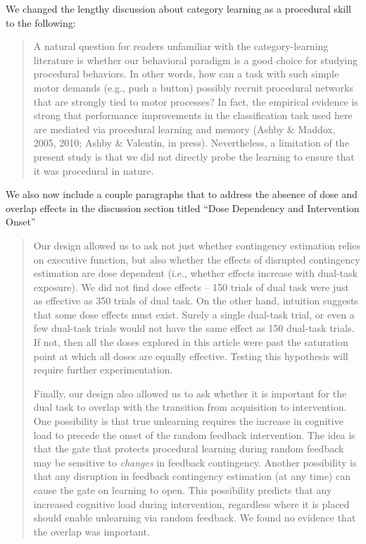 \documentclass[10pt,a4paper]{article}
\begin{document}
We changed the lengthy discussion about category learning as a procedural skill
to the following:

\begin{quote}
  A natural question for readers unfamiliar with the category-learning
  literature is whether our behavioral paradigm is a good choice for studying
  procedural behaviors. In other words, how can a task with such simple motor
  demands (e.g., push a button) possibly recruit procedural networks that are
  strongly tied to motor processes? In fact, the empirical evidence is strong that
  performance improvements in the classification task used here are mediated via
  procedural learning and memory (Ashby \& Maddox, 2005, 2010; Ashby \& Valentin,
  in press). Nevertheless, a limitation of the present study is that we did not
  directly probe the learning to ensure that it was procedural in nature.
\end{quote}

We also now include a couple paragraphs that to address the absence of dose and
overlap effects in the discussion section titled ``Dose Dependency and
Intervention Onset''

\begin{quote}
  Our design allowed us to ask not just whether contingency estimation relies on
  executive function, but also whether the effects of disrupted contingency
  estimation are dose dependent (i.e., whether effects increase with dual-task
  exposure). We did not find dose effects -- 150 trials of dual task were just as
  effective as 350 trials of dual task. On the other hand, intuition suggests that
  some dose effects must exist. Surely a single dual-task trial, or even a few
  dual-task trials would not have the same effect as 150 dual-task trials. If not,
  then all the doses explored in this article were past the saturation point at
  which all doses are equally effective. Testing this hypothesis will require
  further experimentation.

  Finally, our design also allowed us to ask whether it is important for the dual
  task to overlap with the transition from acquisition to intervention. One
  possibility is that true unlearning requires the increase in cognitive load to
  precede the onset of the random feedback intervention. The idea is that the gate
  that protects procedural learning during random feedback may be sensitive to
  \textit{changes} in feedback contingency. Another possibility is that any
  disruption in feedback contingency estimation (at any time) can cause the gate
  on learning to open. This possibility predicts that any increased cognitive load
  during intervention, regardless where it is placed should enable unlearning via
  random feedback. We found no evidence that the overlap was important.
\end{quote}
\end{document}
